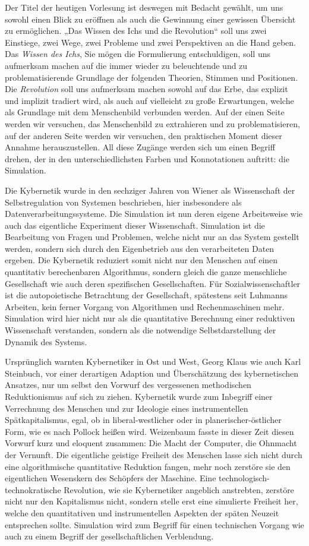\documentclass[a4paper,11pt]{article}
\begin{document}
Der Titel der heutigen Vorlesung ist deswegen mit Bedacht gewählt, um uns
sowohl einen Blick zu eröffnen als auch die Gewinnung einer gewissen Übersicht
zu ermöglichen. „Das Wissen des Ichs und die Revolution“ soll uns zwei
Einstiege, zwei Wege, zwei Probleme und zwei Perspektiven an die Hand
geben. Das \emph{Wissen des Ichs}, Sie mögen die Formulierung entschuldigen,
soll uns aufmerksam machen auf die immer wieder zu beleuchtende und zu
problematisierende Grundlage der folgenden Theorien, Stimmen und Positionen.
Die \emph{Revolution} soll uns aufmerksam machen sowohl auf das Erbe, das
explizit und implizit tradiert wird, als auch auf vielleicht zu große
Erwartungen, welche als Grundlage mit dem Menschenbild verbunden werden. Auf
der einen Seite werden wir versuchen, das Menschenbild zu extrahieren und zu
problematisieren, auf der anderen Seite werden wir versuchen, den praktischen
Moment dieser Annahme herauszustellen. All diese Zugänge werden sich um einen
Begriff drehen, der in den unterschiedlichsten Farben und Konnotationen
auftritt: die Simulation.

Die Kybernetik wurde in den sechziger Jahren von Wiener als Wissenschaft der
Selbstregulation von Systemen beschrieben, hier insbesondere als
Datenverarbeitungssysteme. Die Simulation ist nun deren eigene Arbeitsweise
wie auch das eigentliche Experiment dieser Wissenschaft. Simulation ist die
Bearbeitung von Fragen und Problemen, welche nicht nur an das System gestellt
werden, sondern sich durch den Eigenbetrieb aus den verarbeiteten Daten
ergeben. Die Kybernetik reduziert somit nicht nur den Menschen auf einen
quantitativ berechenbaren Algorithmus, sondern gleich die ganze menschliche
Gesellschaft wie auch deren spezifischen Gesellschaften. Für
Sozialwissenschaftler ist die autopoietische Betrachtung der Gesellschaft,
spätestens seit Luhmanns Arbeiten, kein ferner Vorgang von Algorithmen und
Rechenmaschinen mehr. Simulation wird hier nicht nur als die quantitative
Berechnung einer reduktiven Wissenschaft verstanden, sondern als die
notwendige Selbstdarstellung der Dynamik des Systems.

Ursprünglich warnten Kybernetiker in Ost und West, Georg Klaus wie auch Karl
Steinbuch, vor einer derartigen Adaption und Überschätzung des kybernetischen
Ansatzes, nur um selbst den Vorwurf des vergessenen methodischen
Reduktionismus auf sich zu ziehen. Kybernetik wurde zum Inbegriff einer
Verrechnung des Menschen und zur Ideologie eines instrumentellen
Spätkapitalismus, egal, ob in liberal-westlicher oder in
planerischer-östlicher Form, wie es nach Pollock heißen wird. Weizenbaum
fasste in dieser Zeit diesen Vorwurf kurz und eloquent zusammen: Die Macht der
Computer, die Ohnmacht der Vernunft. Die eigentliche geistige Freiheit des
Menschen lasse sich nicht durch eine algorithmische quantitative Reduktion
fangen, mehr noch zerstöre sie den eigentlichen Wesenskern des Schöpfers der
Maschine. Eine technologisch-technokratische Revolution, wie sie Kybernetiker
angeblich anstrebten, zerstöre nicht nur den Kapitalismus nicht, sondern
stelle erst eine simulierte Freiheit her, welche den quantitativen und
instrumentellen Aspekten der späten Neuzeit entsprechen sollte. Simulation
wird zum Begriff für einen technischen Vorgang wie auch zu einem Begriff der
gesellschaftlichen Verblendung.
\end{document}
